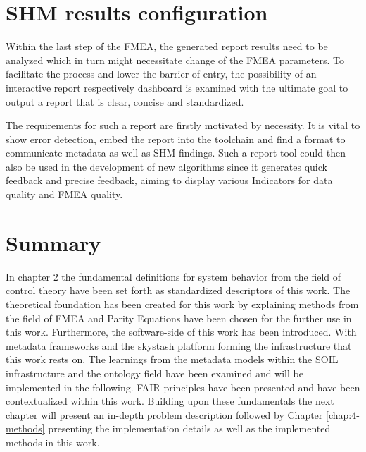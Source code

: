 \newpage


\section{SHM results configuration}

Within the last step of the FMEA, the generated report results need to be analyzed which in turn might necessitate change of the FMEA parameters. To facilitate the process and lower the barrier of entry, the possibility of an interactive report respectively dashboard is examined with the ultimate goal to output a report that is clear, concise and standardized.


The requirements for such a report are firstly motivated by necessity. It is vital to show error detection, embed the report into the toolchain and find a format to communicate metadata as well as SHM findings. Such a report tool could then also be used in the development of new algorithms since it generates quick feedback and precise feedback, aiming to display various Indicators for data quality and FMEA quality.


\section{Summary}
In chapter 2 the fundamental definitions for system behavior from the field of control theory have been set forth as standardized descriptors of this work. The theoretical foundation has been created for this work by explaining methods from the field of FMEA and Parity Equations have been chosen for the further use in this work. Furthermore, the software-side of this work has been introduced. With metadata frameworks and the skystash platform forming the infrastructure that this work rests on. The learnings from the metadata models within the SOIL infrastructure and the ontology field have been examined and will be implemented in the following. FAIR principles have been presented and have been contextualized within this work. Building upon these fundamentals the next chapter will present an in-depth problem description followed by Chapter \ref{chap:4-methods} presenting the implementation details as well as the implemented methods in this work.



